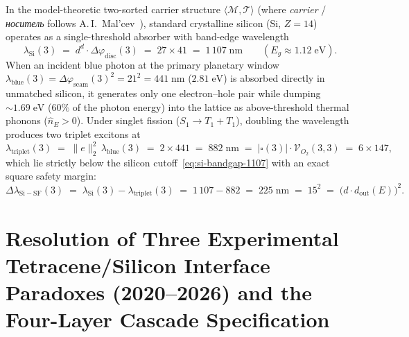 \documentclass[11pt,a4paper]{article}
\theoremstyle{plain}
\theoremstyle{definition}
\begin{document}
In the model-theoretic two-sorted carrier structure $\langle\mathcal{M},\mathcal{T}\rangle$ (where \emph{carrier} / \emph{носитель} follows A.\,I.~Mal'cev~\cite{Malcev1973}), standard crystalline silicon ($\mathrm{Si}$, $Z = 14$) operates as a single-threshold absorber with band-edge wavelength
\begin{equation}
  \label{eq:si-bandgap-1107}
  \lambda_{\mathrm{Si}}(3) \;=\; d^d\cdot\Delta\varphi_{\mathrm{disc}}(3) \;=\; 27\times 41 \;=\; 1\,107\;\text{nm} \qquad (E_g\approx 1.12\;\text{eV}).
\end{equation}
When an incident blue photon at the primary planetary window $\lambda_{\mathrm{blue}}(3) = \Delta\varphi_{\mathrm{seam}}(3)^2 = 21^2 = 441\;\text{nm}$ ($2.81\;\text{eV}$) is absorbed directly in unmatched silicon, it generates only one electron--hole pair while dumping $\sim 1.69\;\text{eV}$ ($60\%$ of the photon energy) into the lattice as above-threshold thermal phonons ($\hat{n}_E > 0$). Under singlet fission ($S_1\to T_1 + T_1$), doubling the wavelength produces two triplet excitons at
\begin{equation}
  \label{eq:triplet-882}
  \lambda_{\mathrm{triplet}}(3) \;=\; \|e\|_2^2\,\lambda_{\mathrm{blue}}(3) \;=\; 2\times 441 \;=\; 882\;\text{nm} \;=\; |\square(3)|\cdot\mathcal{V}_{O_2}(3,3) \;=\; 6\times 147,
\end{equation}
which lie strictly below the silicon cutoff~\eqref{eq:si-bandgap-1107} with an exact square safety margin:
\begin{equation}
  \label{eq:sf-margin-225}
  \Delta\lambda_{\mathrm{Si-SF}}(3) \;=\; \lambda_{\mathrm{Si}}(3) - \lambda_{\mathrm{triplet}}(3) \;=\; 1\,107 - 882 \;=\; 225\;\text{nm} \;=\; 15^2 \;=\; \bigl(d\cdot d_{\mathrm{out}}(E)\bigr)^2.
\end{equation}

\section{Resolution of Three Experimental Tetracene/Silicon Interface Paradoxes (2020--2026) and the Four-Layer Cascade Specification}
\label{sec:three-paradoxes}
\end{document}
